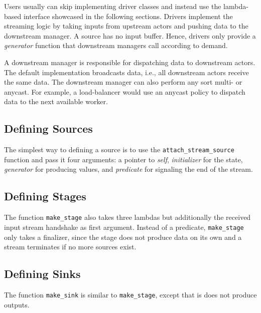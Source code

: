 Users usually can skip implementing driver classes and instead use the
lambda-based interface showcased in the following sections. Drivers implement
the streaming logic by taking inputs from upstream actors and pushing data to
the downstream manager. A source has no input buffer. Hence, drivers only
provide a \emph{generator} function that downstream managers call according to
demand.

A downstream manager is responsible for dispatching data to downstream actors.
The default implementation broadcasts data, i.e., all downstream actors receive
the same data. The downstream manager can also perform any sort multi- or
anycast. For example, a load-balancer would use an anycast policy to dispatch
data to the next available worker.

\clearpage

\subsection{Defining Sources}


The simplest way to defining a source is to use the
\lstinline^attach_stream_source^ function and pass it four arguments: a pointer
to \emph{self}, \emph{initializer} for the state, \emph{generator} for
producing values, and \emph{predicate} for signaling the end of the stream.

\clearpage

\subsection{Defining Stages}


The function \lstinline^make_stage^ also takes three lambdas but additionally
the received input stream handshake as first argument. Instead of a predicate,
\lstinline^make_stage^ only takes a finalizer, since the stage does not produce
data on its own and a stream terminates if no more sources exist.

\clearpage

\subsection{Defining Sinks}


The function \lstinline^make_sink^ is similar to \lstinline^make_stage^, except
that is does not produce outputs.

